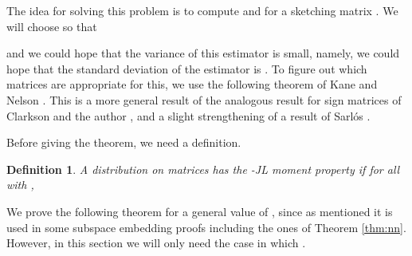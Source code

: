 \documentclass[11pt]{article}
\newtheorem{definition}[theorem]{Definition}
\begin{document}
The idea for solving this problem is to compute  and  
for a sketching matrix . We will choose  so that

and we could hope that the variance of this estimator is small, namely,
we could hope that the standard deviation of the estimator is . 
To figure out which matrices  are appropriate for this,
we use the following theorem of Kane and Nelson \cite{kn14}. This is a more general result of the 
analogous result for sign matrices of Clarkson and the author \cite{CW09}, and a slight strengthening 
of a result of Sarl\'{o}s \cite{S06}. 

Before giving the theorem, we need a definition.

\begin{definition}\cite{kn14}\label{def:moment}
A distribution  on matrices  has the 
-JL moment property if for all  with ,

\end{definition}

We prove the following theorem for a general value of , since as mentioned it is used in some
subspace embedding proofs including the ones of Theorem \ref{thm:nn}. However, in this section we will only
need the case in which . 
\end{document}
